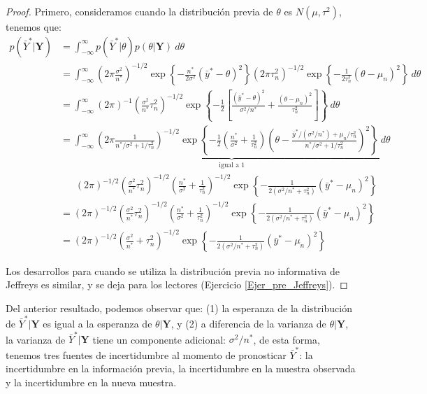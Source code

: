 \documentclass[10pt,openright]{book}\usepackage[]{graphicx}\usepackage[]{color}
\begin{document}
    \begin{proof}
    Primero, consideramos cuando la distribuci\'on previa de $\theta$ es $N(\mu,\tau^2)$, tenemos que:
    \begin{align*}
    p(\bar{Y}^*|\mathbf{Y})&=\int_{-\infty}^\infty p(\bar{Y}^*|\theta)p(\theta|\mathbf{Y})\ d\theta\\
    &=\int_{-\infty}^\infty (2\pi\frac{\sigma^2}{n^*})^{-1/2}\exp\left\{-\frac{n^*}{2\sigma^2}(\bar{y}^*-\theta)^2\right\}
    (2\pi\tau_n^2)^{-1/2}\exp\left\{-\frac{1}{2\tau_n^2}(\theta-\mu_n)^2\right\}\ d\theta\\
    &=\int_{-\infty}^\infty (2\pi)^{-1}(\frac{\sigma^2}{n^*}\tau_n^2)^{-1/2}\exp\left\{-\frac{1}{2}\left[\frac{(\bar{y}^*-\theta)^2}{\sigma^2/n^*}+\frac{(\theta-\mu_n)^2}{\tau^2_n}\right]\right\}\ d\theta\\
    &=\underbrace{\int_{-\infty}^\infty(2\pi\frac{1}{n^*/\sigma^2+1/\tau^2_n})^{-1/2}\exp\left\{-\frac{1}{2}\left(\frac{n^*}{\sigma^2}+\frac{1}{\tau^2_n}\right)\left(\theta-\frac{\bar{y}^*/(\sigma^2/n^*)+\mu_n/\tau^2_n}{n^*/\sigma^2+1/\tau^2_n}\right)^2\right\}\ d\theta}_{\text{igual a 1}}\\
    &\ \ \ \ \ \ \ (2\pi)^{-1/2}(\frac{\sigma^2}{n^*}\tau_n^2)^{-1/2}(\frac{n^*}{\sigma^2}+\frac{1}{\tau^2_n})^{-1/2}\exp\left\{-\frac{1}{2(\sigma^2/n^*+\tau^2_n)}(\bar{y}^*-\mu_n)^2\right\}\\
    &=(2\pi)^{-1/2}(\frac{\sigma^2}{n^*}\tau_n^2)^{-1/2}(\frac{n^*}{\sigma^2}+\frac{1}{\tau^2_n})^{-1/2}\exp\left\{-\frac{1}{2(\sigma^2/n^*+\tau^2_n)}(\bar{y}^*-\mu_n)^2\right\}\\
    &=(2\pi)^{-1/2}(\frac{\sigma^2}{n^*}+\tau^2_n)^{-1/2}\exp\left\{-\frac{1}{2(\sigma^2/n^*+\tau^2_n)}(\bar{y}^*-\mu_n)^2\right\}
    \end{align*}
    
    Los desarrollos para cuando se utiliza la distribuci\'on previa no informativa de Jeffreys es similar, y se deja para los lectores (Ejercicio \ref{Ejer_pre_Jeffreys}). 
    \end{proof}
    
    Del anterior resultado, podemos observar que: (1) la esperanza de la distribuci\'on de $\bar{Y}^*|\mathbf{Y}$ es igual a la esperanza de $\theta|\mathbf{Y}$, y (2) a diferencia de la varianza de $\theta|\mathbf{Y}$, la varianza de $\bar{Y}^*|\mathbf{Y}$ tiene un componente adicional: $\sigma^2/n^*$, de esta forma, tenemos tres fuentes de incertidumbre al momento de pronosticar $\bar{Y}^*$: la incertidumbre en la informaci\'on previa, la incertidumbre en la muestra observada y la incertidumbre en la nueva muestra.
    
\end{document}
